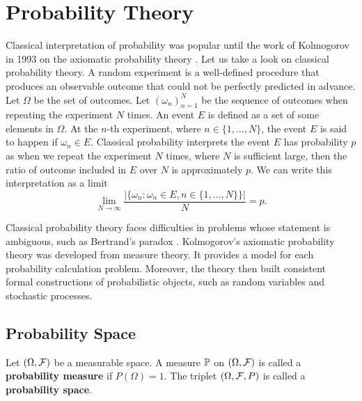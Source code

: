 \section{Probability Theory}

Classical interpretation of probability was popular until the work of Kolmogorov in 1993 on the axiomatic probability theory \cite{kolmogorov2018foundations}. Let us take a look on classical probability theory. A random experiment is a well-defined procedure that produces an observable outcome that could not be perfectly predicted in advance. Let $\Omega$ be the set of outcomes. Let $(\omega_n)_{n=1}^N$ be the sequence of outcomes when repeating the experiment $N$ times. An event $E$ is defined as a set of some elements in $\Omega$. At the $n$-th experiment, where $n\in\{1,\ldots,N\}$, the event $E$ is said to happen if $\omega_n\in E$. Classical probability interprets the event $E$ has probability $p$ as when we repeat the experiment $N$ times, where $N$ is sufficient large, then the ratio of outcome included in $E$ over $N$ is approximately $p$. We can write this interpretation as a limit
$$\lim\limits_{N\to\infty}\dfrac{|\{\omega_n : \omega_n\in E, n\in\{1,\ldots,N\}\}|}{N} = p.$$

Classical probability theory faces difficulties in problems whose statement is ambiguous, such as Bertrand's paradox \cite{shackel2007bertrand}. Kolmogorov's axiomatic probability theory was developed from measure theory. It provides a model for each probability calculation problem. Moreover, the theory then built consistent formal constructions of probabilistic objects, such as random variables and stochastic processes.

\subsection{Probability Space}

\begin{definition}
 Let $(\Omega, \mathcal{F})$ be a measurable space. A measure $\mathbb{P}$ on $(\Omega, \mathcal{F})$ is called a \textbf{probability measure} if $P(\Omega)=1$. The triplet $(\Omega, \mathcal{F}, P)$ is called a \textbf{probability space}.
\end{definition}

